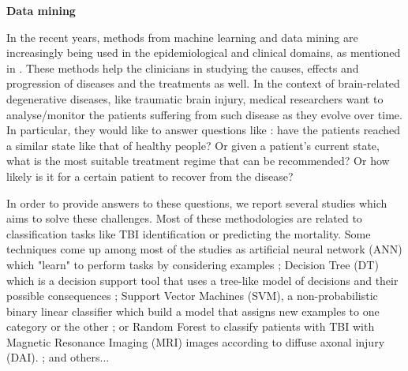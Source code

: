 \documentclass[runningheads]{llncs}
\begin{document}
\newpage
\noindent
\textbf{Data mining}

In the recent years, methods from machine learning and data mining are increasingly being used in the epidemiological and clinical domains, as mentioned in \cite{siddiqui_predicting_2015}. These methods help the clinicians in studying the causes, effects and progression of diseases and the treatments as well. In the context of brain-related degenerative diseases, like traumatic brain injury, medical researchers want to analyse/monitor the patients suffering from such disease as they evolve over time. In particular, they would like to answer questions like : have the patients reached a similar state like that of healthy people? Or given a patient's current state, what is the most suitable treatment regime that can be recommended? Or how likely is it for a certain patient to recover from the disease?

In order to provide answers to these questions, we report several studies which aims to solve these challenges. Most of these methodologies are related to classification tasks like TBI identification or predicting the mortality. Some techniques come up among most of the studies as artificial neural network (ANN) which "learn" to perform tasks by considering examples ; Decision Tree (DT) which is a decision support tool that uses a tree-like model of decisions and their possible consequences ; Support Vector Machines (SVM), a non-probabilistic binary linear classifier which build a model that assigns new examples to one category or the other ; or Random Forest to classify patients with TBI with Magnetic Resonance Imaging (MRI) images according to diffuse axonal injury (DAI). \cite{mitra_statistical_2016} ; and others...
\end{document}
